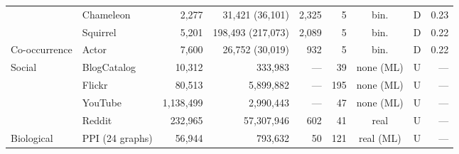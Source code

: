 \begin{table}[htbp]
\begin{tabular}{llrrrrccr}
 & Chameleon         & 2{,}277  & 31{,}421 (36{,}101)  & 2{,}325 & 5  & bin.    & D & 0.23 \\
 & Squirrel          & 5{,}201  & 198{,}493 (217{,}073)& 2{,}089 & 5  & bin.    & D & 0.22 \\
\cmidrule(l){2-9}
Co-occurrence
 & Actor             & 7{,}600  & 26{,}752 (30{,}019)  & 932     & 5  & bin.    & D & 0.22 \\
\midrule
\multirow{4}{*}{Social}
 & BlogCatalog       & 10{,}312 & 333{,}983            & ---     & 39 & none (ML) & U & --- \\
 & Flickr            & 80{,}513 & 5{,}899{,}882        & ---     & 195& none (ML) & U & --- \\
 & YouTube           & 1{,}138{,}499 & 2{,}990{,}443   & ---     & 47 & none (ML) & U & --- \\
 & Reddit            & 232{,}965 & 57{,}307{,}946      & 602     & 41 & real    & U & --- \\
\midrule
Biological
 & PPI (24 graphs)   & 56{,}944 & 793{,}632            & 50      & 121& real (ML) & U & --- \\
\bottomrule
\end{tabular}
\end{table}

